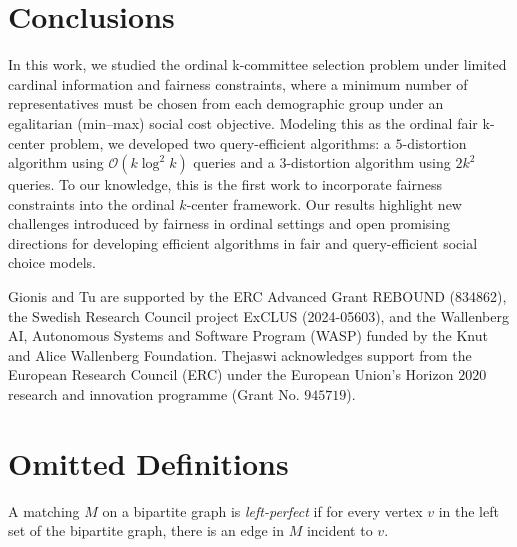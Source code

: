 \documentclass{article}
\newcommand{\bigO}{\ensuremath{\mathcal{O}}\xspace}
\begin{document}



\section{Conclusions}


In this work, we studied the ordinal k-committee selection problem under limited cardinal information and fairness constraints, where a minimum number of representatives must be chosen from each demographic group under an egalitarian (min–max) social cost objective. Modeling this as the ordinal fair k-center problem, we developed two query-efficient algorithms: a $5$-distortion algorithm using $\bigO(k \log^2 k)$ queries and a $3$-distortion algorithm using $2k^2$ queries.
To our knowledge, this is the first work to incorporate fairness constraints into the ordinal $k$-center framework. Our results highlight new challenges introduced by fairness in ordinal settings and open promising directions for developing efficient algorithms in fair and query-efficient social choice models.

Gionis and Tu are supported by 
the ERC Advanced Grant REBOUND (834862),
the Swedish Research Council project ExCLUS (2024-05603),
and the Wallenberg AI, Autonomous Systems and Software Program (WASP) funded by the Knut and Alice Wallenberg Foundation.
Thejaswi acknowledges support from the European Research Council (ERC) under the European Union's Horizon $2020$ research and innovation programme (Grant No. $945719$). 



\clearpage


 


\clearpage

\appendix 







\section{Omitted Definitions  }
\begin{definition}
    \label{definition:left-perfect-matching}
    A matching $M$ on a bipartite graph is \emph{left-perfect} if for every vertex $v$ in the left set of the bipartite graph, there is an edge in $M$ incident to $v$.
\end{definition}
\end{document}
